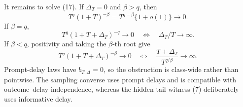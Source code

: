 It remains to solve (17).  If \(\Delta_T=0\) and \(\beta>q\), then
\[
 T^q(1+T)^{-\beta}=T^{q-\beta}\{1+o(1)\}\longrightarrow0. \tag{18}
\]
If \(\beta=q\),
\[
 T^q(1+T+\Delta_T)^{-q}\longrightarrow0
 \quad\Longleftrightarrow\quad \Delta_T/T\longrightarrow\infty. \tag{19}
\]
If \(\beta<q\), positivity and taking the \(\beta\)-th root give
\[
 T^q(1+T+\Delta_T)^{-\beta}\longrightarrow0
 \quad\Longleftrightarrow\quad
 \frac{T+\Delta_T}{T^{q/\beta}}\longrightarrow\infty. \tag{20}
\]
Prompt-delay laws have \(b_{T,\Delta}=0\), so the obstruction is class-wide rather than pointwise.  The sampling converse uses prompt delays and is compatible with outcome--delay independence, whereas the hidden-tail witness (7) deliberately uses informative delay.
